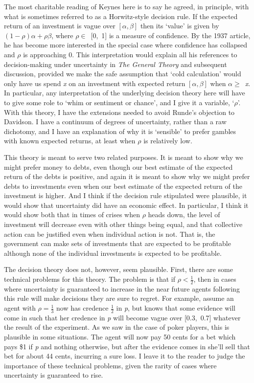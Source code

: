 \documentclass[
  10pt,
  letterpaper,
  DIV=11,
  numbers=noendperiod,
  twoside]{scrartcl}
\begin{document}
The most charitable reading of Keynes here is to say he agreed, in
principle, with what is sometimes referred to as a Horwitz-style
decision rule. If the expected return of an investment is vague over
\([\alpha, \beta]\) then its `value' is given by
\((1-\rho)\alpha + \rho \beta\), where \(\rho \in\)~{[}0,~1{]} is a
measure of confidence. By the 1937 article, he has become more
interested in the special case where confidence has collapsed and
\(\rho\) is approaching 0. This interpretation would explain all his
references to decision-making under uncertainty in \emph{The General
Theory} and subsequent discussion, provided we make the safe assumption
that `cold calculation' would only have us spend \emph{x} on an
investment with expected return \([\alpha, \beta]\) when
\(\alpha \geq\)~\emph{x}. In particular, any interpretation of the
underlying decision theory here will have to give some role to `whim or
sentiment or chance', and I give it a variable, `\(\rho\)'. With this
theory, I have the extensions needed to avoid Runde's objection to
Davidson. I have a continuum of degrees of uncertainty, rather than a
raw dichotomy, and I have an explanation of why it is `sensible' to
prefer gambles with known expected returns, at least when \(\rho\) is
relatively low.

This theory is meant to serve two related purposes. It is meant to show
why we might prefer money to debts, even though our best estimate of the
expected return of the debts is positive, and again it is meant to show
why we might prefer debts to investments even when our best estimate of
the expected return of the investment is higher. And I think if the
decision rule stipulated were plausible, it would show that uncertainty
did have an economic effect. In particular, I think it would show both
that in times of crises when \(\rho\) heads down, the level of
investment will decrease even with other things being equal, and that
collective action can be justified even when individual action is not.
That is, the government can make sets of investments that are expected
to be profitable although none of the individual investments is expected
to be profitable.

The decision theory does not, however, seem plausible. First, there are
some technical problems for this theory. The problem is that if
\(\rho < \frac{1}{2}\), then in cases where uncertainty is guaranteed to
increase in the near future agents following this rule will make
decisions they are sure to regret. For example, assume an agent with
\(\rho = \frac{1}{3}\) now has credence \(\frac{1}{2}\) in \emph{p}, but
knows that some evidence will come in such that her credence in \emph{p}
will become vague over {[}0.3,~0.7{]} whatever the result of the
experiment. As we saw in the case of poker players, this is plausible in
some situations. The agent will now pay 50 cents for a bet which pays
\$1 if \emph{p} and nothing otherwise, but after the evidence comes in
she'll sell that bet for about 44 cents, incurring a sure loss. I leave
it to the reader to judge the importance of these technical problems,
given the rarity of cases where uncertainty is guaranteed to rise.
\end{document}
